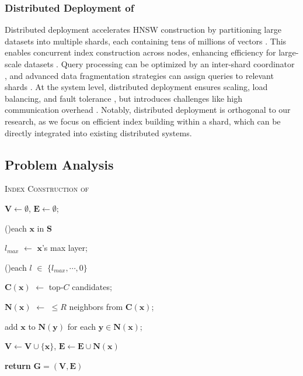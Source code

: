 \subsubsection{\textbf{Distributed Deployment of }}
\label{subsubsec: Distri Deploy HNSW}
Distributed deployment accelerates HNSW construction by partitioning large datasets into multiple shards, each containing tens of millions of vectors \cite{Manu_zilliz,lanns,IwabuchiSPPS23,deng2019pyramid}. This enables concurrent index construction across nodes, enhancing efficiency for large-scale datasets \cite{lanns}. Query processing can be optimized by an inter-shard coordinator \cite{Manu_zilliz}, and advanced data fragmentation strategies can assign queries to relevant shards \cite{ZhangYGWHLLZT23,ELPIS}. At the system level, distributed deployment ensures scaling, load balancing, and fault tolerance \cite{Starling}, but introduces challenges like high communication overhead \cite{MiaoZSNYTC21,Milvus_sigmod2021}. Notably, distributed deployment is orthogonal to our research, as we focus on efficient index building within a shard, which can be directly integrated into existing distributed systems.

\subsection{Problem Analysis}
\label{subsec: problem analysis}

\setlength{\textfloatsep}{0pt}
\begin{algorithm}[t]
\label{alg: hnsw construction}
  \caption{\textsc{Index Construction of }}
  \LinesNumbered

  $\boldsymbol{V} \gets \emptyset$, $\boldsymbol{E} \gets \emptyset$; 

  \For(){each $\boldsymbol{x}$ in $\boldsymbol{S}$}{
    $l_{max}$ $\gets$ $\boldsymbol{x}$'s max layer; 

    \For(){each $l$ $\in$ $\{l_{max}, \cdots, 0\}$}{
      $\boldsymbol{C(x)}$ $\gets$ top-$C$ candidates; 

      $\boldsymbol{N(x)}$ $\gets$ $\leq R$ neighbors from $\boldsymbol{C(x)}$; 

      add $\boldsymbol{x}$ to $\boldsymbol{N(y)}$ for each $\boldsymbol{y}\in \boldsymbol{N(x)}$; 
    }

    $\boldsymbol{V}\gets \boldsymbol{V}\cup \{\boldsymbol{x}\}$, $\boldsymbol{E}\gets \boldsymbol{E} \cup \boldsymbol{N(x)}$
    
  }
  
  \textbf{return} $\boldsymbol{G}=(\boldsymbol{V},\boldsymbol{E})$
\end{algorithm}

